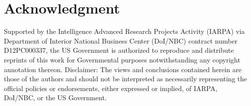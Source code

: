 \documentclass[twoside,leqno,twocolumn]{article}
\begin{document}

\section{Acknowledgment}
Supported by the Intelligence Advanced Research Projects Activity (IARPA) via Department of Interior National Business Center (DoI/NBC) contract number D12PC000337, the US Government is authorized to reproduce and distribute reprints of this work for Governmental purposes notwithstanding any copyright annotation thereon. Disclaimer: The views and conclusions contained herein are those of the authors and should not be interpreted as necessarily representing the official policies or endorsements, either expressed or implied, of IARPA, DoI/NBC, or the US Government.




\end{document}
